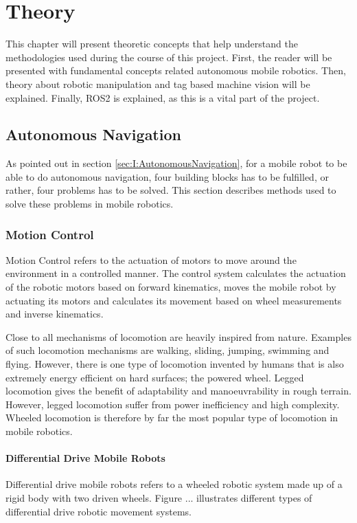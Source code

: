 \chapter{Theory}
This chapter will present theoretic concepts that help understand the methodologies used during the course of this project. First, the reader will be presented with fundamental concepts related autonomous mobile robotics. Then, theory about robotic manipulation and tag based machine vision will be explained. Finally, ROS2 is explained, as this is a vital part of the project.

\section{Autonomous Navigation}
As pointed out in section \ref{sec:I:AutonomousNavigation}, for a mobile robot to be able to do autonomous navigation, four building blocks has to be fulfilled, or rather, four problems has to be solved. This section describes methods used to solve these problems in mobile robotics.

\subsection{Motion Control}
Motion Control refers to the actuation of motors to move around the environment in a controlled manner. The control system calculates the actuation of the robotic motors based on forward kinematics, moves the mobile robot by actuating its motors and calculates its movement based on wheel measurements and inverse kinematics.

Close to all mechanisms of locomotion are heavily inspired from nature. Examples of such locomotion mechanisms are walking, sliding, jumping, swimming and flying. However, there is one type of locomotion invented by humans that is also extremely energy efficient on hard surfaces; the powered wheel. Legged locomotion gives the benefit of adaptability and manoeuvrability in rough terrain. However, legged locomotion suffer from power inefficiency and high complexity. Wheeled locomotion is therefore by far the most popular type of locomotion in mobile robotics\cite{SiegwartRoland2011Itam}.

\subsubsection{Differential Drive Mobile Robots}
Differential drive mobile robots refers to a wheeled robotic system made up of a rigid body with two driven wheels. Figure ... illustrates different types of differential drive robotic movement systems.


